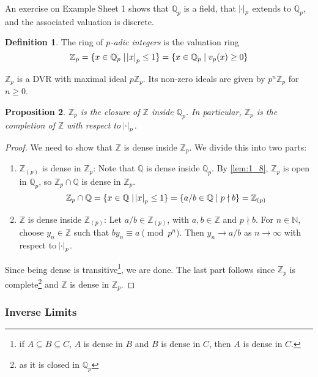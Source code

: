 \documentclass[11pt]{article}
\theoremstyle{definition}
\newtheorem{definition}{Definition}[subsection]
\theoremstyle{plain}
\newtheorem{proposition}[definition]{Proposition}
\theoremstyle{remark}
\newcommand{\NN}{\mathbb{N}}
\newcommand{\ZZ}{\mathbb{Z}}
\newcommand{\QQ}{\mathbb{Q}}
\begin{document}
An exercise on Example Sheet 1 shows that $\QQ_p$ is a field, that $\abs{\cdot}_p$ extends to $\QQ_p$, and the associated valuation is discrete.

\begin{definition}\label{def:3_1}
    The ring of \emph{$p$-adic integers} is the valuation ring
    \begin{equation*}
        \ZZ_p = \{x \in \QQ_p \mid \abs{x}_p \le 1\} = \{x \in \QQ_p \mid v_p(x) \ge 0\}
    \end{equation*}
\end{definition}

\noindent $\ZZ_p$ is a DVR with maximal ideal $p \ZZ_p$. Its non-zero ideals are given by $p^n \ZZ_p$ for $n \ge 0$.

\begin{proposition}\label{prop:3_2}
    $\ZZ_p$ is the closure of $\ZZ$ inside $\QQ_p$. In particular, $\ZZ_p$ is the completion of $\ZZ$ with respect to $\abs{\cdot}_p$.
\end{proposition}
\begin{proof}
    We need to show that $\ZZ$ is dense inside $\ZZ_p$. We divide this into two parts:
    \begin{enumerate}
        \item $\ZZ_{(p)}$ is dense in $\ZZ_p$: Note that $\QQ$ is dense inside $\QQ_p$. By \autoref{lem:1_8}, $\ZZ_p$ is open in $\QQ_p$, so $\ZZ_p \cap \QQ$ is dense in $\ZZ_p$.
            \begin{equation*}
                \ZZ_p \cap \QQ = \{x \in \QQ \mid \abs{x}_p \le 1\} = \{a/b \in \QQ \mid p \nmid b\} = \ZZ_{(p)}
            \end{equation*}
        \item $\ZZ$ is dense inside $\ZZ_{(p)}$:
    Let $a/b \in \ZZ_{(p)}$, with $a, b \in \ZZ$ and $p \nmid b$. For $n \in \NN$, choose $y_n \in \ZZ$ such that $b y_n \equiv a \pmod{p^n}$. Then $y_n \to a/b$ as $n \to \infty$ with respect to $\abs{\cdot}_p$.
    \end{enumerate}
    Since being dense is transitive\footnote{if $A \subseteq B \subseteq C$, $A$ is dense in $B$ and $B$ is dense in $C$, then $A$ is dense in $C$.}, we are done. The last part follows since $\ZZ_p$ is complete\footnote{as it is closed in $\QQ_p$} and $\ZZ$ is dense in $\ZZ_p$.
\end{proof}

\subsubsection*{Inverse Limits}
\end{document}
